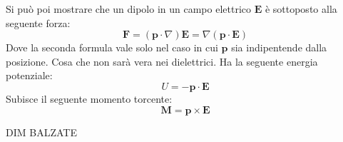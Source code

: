 \documentclass{article}
\newcommand{\mbf}{\mathbf}
\numberwithin{equation}{section}
\begin{document}
Si può poi mostrare che un dipolo in un campo elettrico $\mbf E$ è sottoposto alla seguente forza:
\begin{equation}
    \mbf F = (\mbf p \cdot \nabla ) \mbf E = \nabla ( \mbf{ p \cdot E })
\end{equation}
Dove la seconda formula vale solo nel caso in cui $\mbf p$ sia indipentende dalla posizione. Cosa che non sarà vera nei dielettrici.
Ha la seguente energia potenziale:
\begin{equation}
    U = - \mbf{p \cdot E}
\end{equation}
Subisce il seguente momento torcente:
\begin{equation}
    \mbf{ M = p \times E}
\end{equation}

DIM BALZATE

\end{document}

